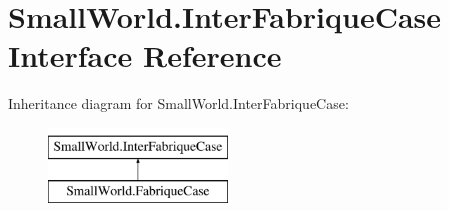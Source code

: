 \hypertarget{interface_small_world_1_1_inter_fabrique_case}{\section{Small\-World.\-Inter\-Fabrique\-Case Interface Reference}
\label{interface_small_world_1_1_inter_fabrique_case}
}
Inheritance diagram for Small\-World.\-Inter\-Fabrique\-Case\-:\begin{figure}[H]
\begin{center}
\leavevmode
\includegraphics[height=2.000000cm]{interface_small_world_1_1_inter_fabrique_case}
\end{center}
\end{figure}
